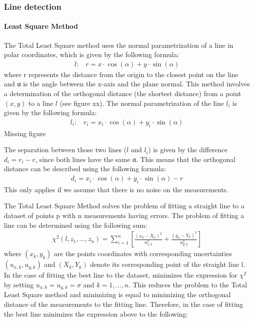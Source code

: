 \documentclass[../Head/Main.tex]{subfiles}
\begin{document}
\subsubsection{Line detection}
\paragraph{Least Square Method}
The Total Least Square method uses the normal parametrization of a line in polar coordinates, which is given by the following formula:
\begin{align}
    l:~~~~r = x\cdot\cos(\alpha)+y\cdot\sin(\alpha)
\end{align}
where r represents the distance from the origin to the closest point on the line and α is the angle between the x-axis and the plane normal. This method involves a determination of the orthogonal distance (the shortest distance) from a point $(x,y)$ to a line $l$ (see figure xx). The normal parametrization of the line $l_i$ is given by the following formula:
\begin{align}
    l_i:~~~~r_i = x_i\cdot\cos(\alpha)+y_i\cdot\sin(\alpha)
\end{align}
{\color{red} Missing figure} \par
The separation between those two lines ($l$ and $l_i$) is given by the difference $d_i=r_i-r$, since both lines have the same α. This means that the orthogonal distance can be described using the following formula:
\begin{align}
    d_i = x_i\cdot\cos(\alpha)+y_i\cdot\sin(\alpha) - r
\end{align}
This only applies if we assume that there is no noise on the measurements. \par
The Total Least Square Method solves the problem of fitting a straight line to a dataset of points p with n measurements having errors. The problem of fitting a line can be determined using the following sum:
\begin{align}
    \chi^2\left(l, z_1, ..., z_n\right) = \sum_{i = 1}^{n} \left[\frac{\left(x_k - X_k\right)^2}{u_{x, k}^{2}} + \frac{\left(y_k - Y_k\right)^2}{u_{y, k}^{2}}\right]
\end{align}
where $(x_k,y_k)$ are the points coordinates with corresponding uncertainties $(u_{x, k},u_{y, k})$ and $(X_k,Y_k)$ denote its corresponding point of the straight line l. In the case of fitting the best line to the dataset, minimizes the expression for $\chi^2$ by setting $u_{x, k}=u_{y, k}=\sigma$ and $k=1,…,n$. This reduces the problem to the Total Least Square method and minimizing is equal to minimizing the orthogonal distance of the measurements to the fitting line. Therefore, in the case  of fitting the best line minimizes the expression above to the following:
\end{document}
